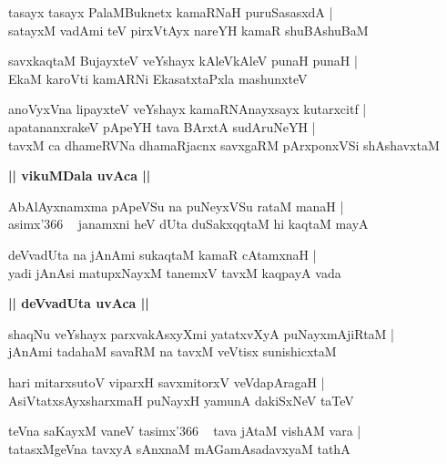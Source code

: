 \documentclass[twoside,12pt,openright]{book}
\newcounter{shloka}[chapter]
\def\uvaca#1{\centerline{{\large\textbf{#1}}}}
\begin{document}
\begin{shloka}
tasayx tasayx PalaMBuknetx kamaRNaH puruSasasxdA |\\
satayxM vadAmi teV pirxVtAyx nareYH kamaR shuBAshuBaM 
\end{shloka}


\begin{shloka}
savxkaqtaM BujayxteV veYshayx kAleVkAleV punaH punaH |\\
EkaM karoVti kamARNi EkasatxtaPxla mashunxteV 
\end{shloka}

\begin{shloka}
anoVyxVna lipayxteV veYshayx kamaRNAnayxsayx kutarxcitf |\\
apatananxrakeV pApeYH tava BArxtA sudAruNeYH |\\
tavxM ca dhameRVNa dhamaRjacnx savxgaRM pArxponxVSi shAshavxtaM 
\end{shloka}

\uvaca{|| vikuMDala uvAca ||}

\begin{shloka}
AbAlAyxnamxma pApeVSu na puNeyxVSu rataM manaH |\\
asimx\char'366 ~ janamxni heV dUta duSakxqqtaM hi kaqtaM mayA 
\end{shloka}

\begin{shloka}
deVvadUta na jAnAmi sukaqtaM kamaR cAtamxnaH |\\
yadi jAnAsi matupxNayxM tanemxV tavxM kaqpayA vada 
\end{shloka}

\uvaca{|| deVvadUta uvAca ||}

\begin{shloka}
shaqNu veYshayx parxvakAsxyXmi yatatxvXyA puNayxmAjiRtaM |\\
jAnAmi tadahaM savaRM na tavxM veVtisx sunishicxtaM 
\end{shloka}

\begin{shloka}
hari mitarxsutoV viparxH savxmitorxV veVdapAragaH |\\
AsiVtatxsAyxsharxmaH puNayxH yamunA dakiSxNeV taTeV 
\end{shloka}

\begin{shloka}
teVna saKayxM vaneV tasimx\char'366 ~ tava jAtaM vishAM vara |\\
tatasxMgeVna tavxyA sAnxnaM mAGamAsadavxyaM tathA  
\end{shloka}
\end{document}
